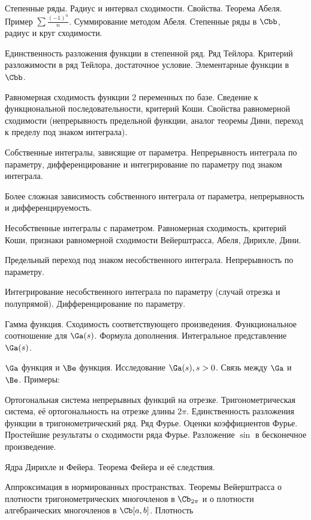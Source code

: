 \documentclass[a4paper]{article}
\begin{document}
\begin{nums}{-2}
\item Степенные ряды. Радиус и интервал сходимости. Свойства. Теорема Абеля. Пример $\sum \frac{(-1)^n}{n}$.
Суммирование методом
Абеля. Степенные ряды в $\Cbb$, радиус и круг сходимости.
\item Единственность разложения функции в степенной ряд. Ряд Тейлора. Критерий разложимости в ряд Тейлора,
достаточное условие.
Элементарные функции в $\Cbb$.
\item Равномерная сходимость функции 2 переменных по базе. Сведение к функциональной последовательности, критерий Коши.
Свойства равномерной сходимости (непрерывность предельной функции, аналог теоремы Дини, переход к пределу под
знаком интеграла).
\item Собственные интегралы, зависящие от параметра. Непрерывность интеграла по параметру, дифференцирование и
интегрирование по параметру под знаком интеграла.
\item Более сложная зависимость собственного интеграла от параметра, непрерывность и дифференцируемость.
\item Несобственные интегралы с параметром. Равномерная сходимость, критерий Коши, признаки равномерной сходимости
Вейерштрасса, Абеля, Дирихле, Дини.
\item Предельный переход под знаком несобственного интеграла. Непрерывность по параметру.
\item Интегрирование несобственного интеграла по параметру (случай отрезка и полупрямой). Дифференцирование по параметру.
\item Гамма функция. Сходимость соответствующего произведения. Функциональное соотношение для $\Ga(s)$. Формула
дополнения. Интегральное представление $\Ga(s)$.
\item $\Ga$ функция и $\Be$ функция. Исследование $\Ga(s), s > 0$. Связь между $\Ga$ и $\Be$. Примеры:
\item Ортогональная система непрерывных функций на отрезке. Тригонометрическая система, её ортогональность на отрезке
длины $2\pi$. Единственность разложения функции в тригонометрический ряд. Ряд Фурье. Оценки коэффициентов Фурье.
Простейшие результаты о сходимости ряда Фурье. Разложение $\sin$ в бесконечное произведение.
\item Ядра Дирихле и Фейера. Теорема Фейера и её следствия.
\item Аппроксимация в нормированных пространствах. Теоремы Вейерштрасса о плотности тригонометрических
многочленов в $\Cb_{2\pi}$ и о плотности алгебраических многочленов в $\Cb[a,b]$.  Плотность

\end{nums}
\end{document}
